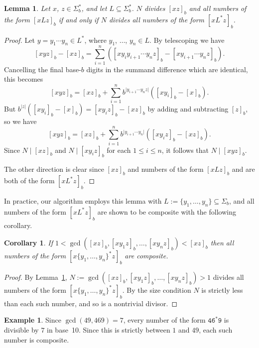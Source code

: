 \documentclass[12pt]{article}
\theoremstyle{plain}
\newtheorem{corollary}[theorem]{Corollary}
\newtheorem{lemma}[theorem]{Lemma}
\theoremstyle{definition}
\newtheorem{example}[theorem]{Example}
\theoremstyle{remark}
\newcommand{\0}{\mathtt{0}}
\newcommand{\1}{\mathtt{1}}
\newcommand{\2}{\mathtt{2}}
\newcommand{\3}{\mathtt{3}}
\newcommand{\4}{\mathtt{4}}
\newcommand{\5}{\mathtt{5}}
\newcommand{\6}{\mathtt{6}}
\newcommand{\7}{\mathtt{7}}
\newcommand{\8}{\mathtt{8}}
\newcommand{\9}{\mathtt{9}}
\begin{document}
\begin{lemma}\label{lemone}
Let $x$, $z\in \Sigma^*_b$, and let $L\subseteq\Sigma^*_b$.
$N$ divides $[xz]_b$ and all numbers of the form $[xLz]_b$
if and only if $N$ divides all numbers of the form $[xL^*z]_b$.
\end{lemma}
\begin{proof}%
Let $y=y_1\dotsm y_n\in L^*$, where $y_1$, $\dotsc$, $y_n\in L$.  
By telescoping we have
\[ [xyz]_b - [xz]_b = \sum_{i=1}^{n}([xy_{i}y_{i+1}\dotsm y_n z]_b-[xy_{i+1}\dotsm y_n z]_b) . \]
Cancelling the final base-$b$ digits in the summand difference 
which are identical, this becomes
\[ [xyz]_b = [xz]_b + \sum_{i=1}^{n}b^{\lvert{y_{i+1}\dotsm y_n z}\rvert}([xy_i]_b-[x]_b) . \]
But $b^{\lvert z\rvert}([xy_i]_b-[x]_b)=[xy_iz]_b-[xz]_b$ by 
adding and subtracting $[z]_b$, so we have
\[ [xyz]_b = [xz]_b + \sum_{i=1}^{n}b^{\vert{y_{i+1}\dotsm y_n}\rvert}([xy_iz]_b-[xz]_b) . \]
Since $N\mid[xz]_b$ and $N\mid[xy_iz]_b$ for each $1\leq i\leq n$,
 it follows that $N\mid[xyz]_b$.
 
The other direction is clear since $[xz]_b$ and numbers of the 
form $[xLz]_b$ and are both of the form $[xL^*z]_b$.
\end{proof}

In practice, our algorithm employs this lemma with 
$L:=\{y_1,\dotsc,y_n\}\subseteq\Sigma_b$, and all numbers of the form
$[xL^*z]_b$ are shown to be composite with the following corollary.
\begin{corollary}\label{corone}
If $1<\gcd([xz]_b,[xy_1z]_b,\dotsc,[xy_nz]_b)<[xz]_b$
 then all numbers of the form $[x\{y_1,\dotsc,y_n\}^*z]_b$ are composite.
\end{corollary}
\begin{proof}
By Lemma~\ref{lemone}, $N:=\gcd([xz]_b,[xy_1z]_b,\dotsc,[xy_nz]_b)>1$ 
divides all numbers of the form $[x\{y_1,\dotsc,y_n\}^*z]_b$.
By the size condition $N$ is strictly less than each such number, and so is a nontrivial divisor.
\end{proof}

\begin{example}
Since $\gcd(49, 469)=7$, every number of the form $\4\6^*\9$ is 
divisible by $7$ in base~10.
Since this is strictly between $1$ and $49$, each such number is composite.
\end{example}
\end{document}
